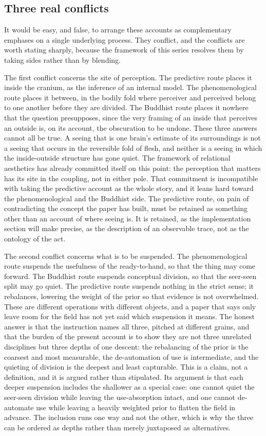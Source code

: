 \subsection{Three real conflicts}
\label{p22:sub:perception-conflicts}

It would be easy, and false, to arrange these accounts as complementary emphases on a single underlying process. They conflict, and the conflicts are worth stating sharply, because the framework of this series resolves them by taking sides rather than by blending.

The first conflict concerns the site of perception. The predictive route places it inside the cranium, as the inference of an internal model. The phenomenological route places it between, in the bodily fold where perceiver and perceived belong to one another before they are divided. The Buddhist route places it nowhere that the question presupposes, since the very framing of an inside that perceives an outside is, on its account, the obscuration to be undone. These three answers cannot all be true. A seeing that is one brain's estimate of its surroundings is not a seeing that occurs in the reversible fold of flesh, and neither is a seeing in which the inside-outside structure has gone quiet. The framework of relational aesthetics has already committed itself on this point: the perception that matters has its site in the coupling, not in either pole. That commitment is incompatible with taking the predictive account as the whole story, and it leans hard toward the phenomenological and the Buddhist side. The predictive route, on pain of contradicting the concept the paper has built, must be retained as something other than an account of where seeing is. It is retained, as the implementation section will make precise, as the description of an observable trace, not as the ontology of the act.

The second conflict concerns what is to be suspended. The phenomenological route suspends the usefulness of the ready-to-hand, so that the thing may come forward. The Buddhist route suspends conceptual division, so that the seer-seen split may go quiet. The predictive route suspends nothing in the strict sense; it rebalances, lowering the weight of the prior so that evidence is not overwhelmed. These are different operations with different objects, and a paper that says only leave room for the field has not yet said which suspension it means. The honest answer is that the instruction names all three, pitched at different grains, and that the burden of the present account is to show they are not three unrelated disciplines but three depths of one descent: the rebalancing of the prior is the coarsest and most measurable, the de-automation of use is intermediate, and the quieting of division is the deepest and least capturable. This is a claim, not a definition, and it is argued rather than stipulated. Its argument is that each deeper suspension includes the shallower as a special case: one cannot quiet the seer-seen division while leaving the use-absorption intact, and one cannot de-automate use while leaving a heavily weighted prior to flatten the field in advance. The inclusion runs one way and not the other, which is why the three can be ordered as depths rather than merely juxtaposed as alternatives.

